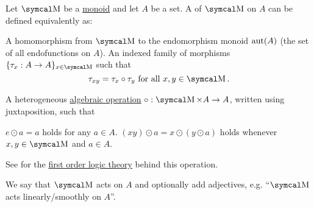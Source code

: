\begin{definition}\label{def:left_monoid_action}
  Let \( \CM \) be a \hyperref[def:unital_magma/associative]{monoid} and let \( A \) be a set. A  of \( \CM \) on \( A \) can be defined equivalently as:
  \begin{DefEnum}
     A homomorphism from \( \CM \) to the endomorphism monoid \( \operatorname{aut}(A) \) (the set of all endofunctions on \( A \)).
     An indexed family of morphisms \( \{ \tau_x: A \to A \}_{x \in \CM} \) such that
    \begin{equation}\label{eq:def:left_monoid_action/indirect_homomorphism}
      \tau_{xy} = \tau_x \circ \tau_y \Tforall x, y \in \CM.
    \end{equation}

     A heterogeneous \hyperref[def:magma]{algebraic operation} \( \circ: \CM \times A \to A \), written using juxtaposition, such that
    \begin{DefEnum}
       \( e \odot a = a \) holds for any \( a \in A \).
       \( (xy) \odot a = x \odot (y \odot a) \) holds whenever \( x, y \in \CM \) and \( a \in A \).
    \end{DefEnum}

    See  for the \hyperref[def:first_order_theory]{first order logic theory} behind this operation.
  \end{DefEnum}

  We say that \( \CM \) acts on \( A \) and optionally add adjectives, e.g. \enquote{\( \CM \) acts linearly/smoothly on \( A \)}.
\end{definition}
